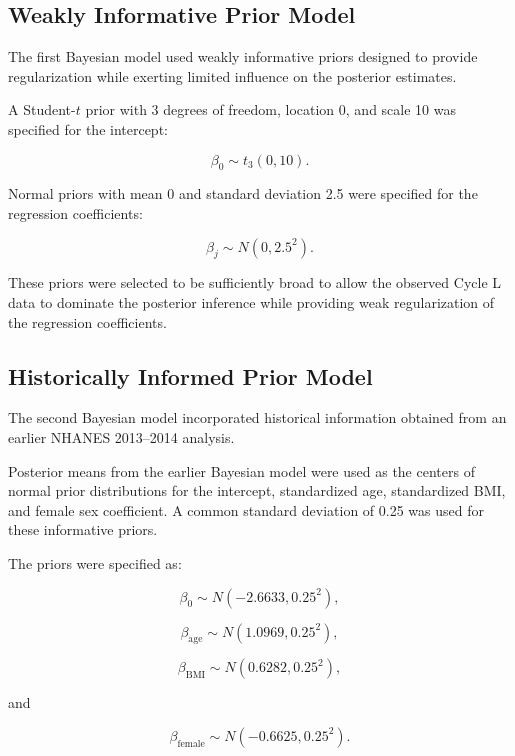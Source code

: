 \documentclass[12pt]{article}
\begin{document}

\subsection{Weakly Informative Prior Model}

The first Bayesian model used weakly informative priors designed to provide regularization while exerting limited influence on the posterior estimates.

A Student-\(t\) prior with 3 degrees of freedom, location 0, and scale 10 was specified for the intercept:

\[
\beta_0
\sim
t_3(0,10).
\]

Normal priors with mean 0 and standard deviation 2.5 were specified for the regression coefficients:

\[
\beta_j
\sim
N(0,2.5^2).
\]

These priors were selected to be sufficiently broad to allow the observed Cycle L data to dominate the posterior inference while providing weak regularization of the regression coefficients.


\subsection{Historically Informed Prior Model}

The second Bayesian model incorporated historical information obtained from an earlier NHANES 2013--2014 analysis.

Posterior means from the earlier Bayesian model were used as the centers of normal prior distributions for the intercept, standardized age, standardized BMI, and female sex coefficient. A common standard deviation of 0.25 was used for these informative priors.

The priors were specified as:

\[
\beta_0
\sim
N(-2.6633,0.25^2),
\]

\[
\beta_{\text{age}}
\sim
N(1.0969,0.25^2),
\]

\[
\beta_{\text{BMI}}
\sim
N(0.6282,0.25^2),
\]

and

\[
\beta_{\text{female}}
\sim
N(-0.6625,0.25^2).
\]
\end{document}
